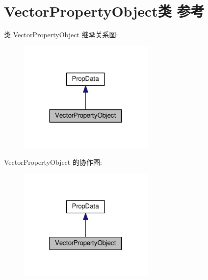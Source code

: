 \hypertarget{class_vector_property_object}{\section{Vector\+Property\+Object类 参考}
\label{class_vector_property_object}
}


类 Vector\+Property\+Object 继承关系图\+:
\nopagebreak
\begin{figure}[H]
\begin{center}
\leavevmode
\includegraphics[width=190pt]{class_vector_property_object__inherit__graph}
\end{center}
\end{figure}


Vector\+Property\+Object 的协作图\+:
\nopagebreak
\begin{figure}[H]
\begin{center}
\leavevmode
\includegraphics[width=190pt]{class_vector_property_object__coll__graph}
\end{center}
\end{figure}
